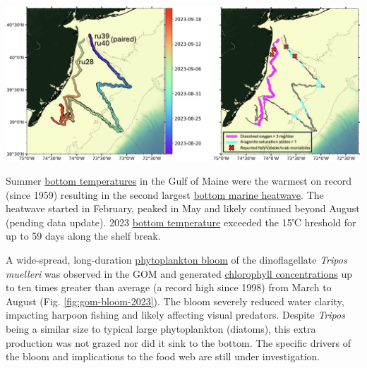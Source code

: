 \documentclass[
  10pt,
]{article}
\let\origfigure\figure
\let\endorigfigure\endfigure
\renewenvironment{figure}[1][2] {
    \expandafter\origfigure\expandafter[H]
} {
    \endorigfigure
}
\begin{document}
\begin{figure}

{\centering \includegraphics[width=0.9\linewidth]{SOE-NEFMC_files/figure-latex/hypoxia-2023-1} 

}

\caption{Left: Mission tracks of three gliders deployed off the coast of New Jersey in August and September of 2023. Right: Locations of hypoxic levels of dissolved oxygen (magenta; < 3 mg/liter) and low aragonite saturation state (cyan; < 1) measured along the glider mission tracks and locations of reported fish, lobster, and/or crab mortalities (red X).}\label{fig:hypoxia-2023}
\end{figure}

Summer \href{https://noaa-edab.github.io/catalog/bottom_temp_comp.html}{bottom temperatures} in the Gulf of Maine were the warmest on record (since 1959) resulting in the second largest \href{https://noaa-edab.github.io/catalog/heatwave_year.html}{bottom marine heatwave}. The heatwave started in February, peaked in May and likely continued beyond August (pending data update). 2023 \href{https://noaa-edab.github.io/catalog/thermal_habitat_persistence.html}{bottom temperature} exceeded the 15℃ hreshold for up to 59 days along the shelf break.

A wide-spread, long-duration \href{https://noaa-edab.github.io/catalog/observation_synthesis.html}{phytoplankton bloom} of the dinoflagellate \emph{Tripos muelleri} was observed in the GOM and generated \href{https://noaa-edab.github.io/catalog/chl_pp.html}{chlorophyll concentrations} up to ten times greater than average (a record high since 1998) from March to August (Fig. \ref{fig:gom-bloom-2023}). The bloom severely reduced water clarity, impacting harpoon fishing and likely affecting visual predators. Despite \emph{Tripos} being a similar size to typical large phytoplankton (diatoms), this extra production was not grazed nor did it sink to the bottom. The specific drivers of the bloom and implications to the food web are still under investigation.
\end{document}
